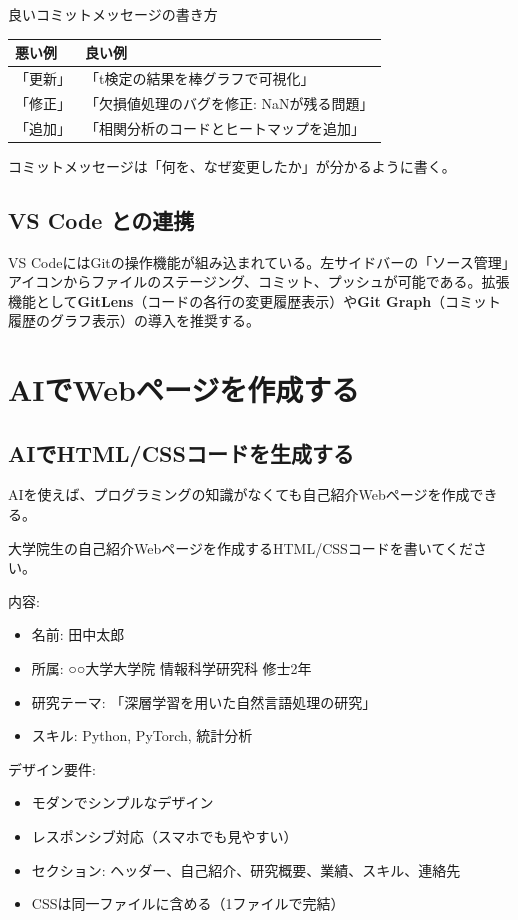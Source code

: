 \begin{itembox}[l]{良いコミットメッセージの書き方}
\begin{table}[H]
\centering
\begin{tabular}{ll}
\toprule
悪い例 & 良い例 \\
\midrule
「更新」 & 「t検定の結果を棒グラフで可視化」 \\
「修正」 & 「欠損値処理のバグを修正: NaNが残る問題」 \\
「追加」 & 「相関分析のコードとヒートマップを追加」 \\
\bottomrule
\end{tabular}
\end{table}
コミットメッセージは「何を、なぜ変更したか」が分かるように書く。
\end{itembox}

\subsection{VS Code との連携}

VS CodeにはGitの操作機能が組み込まれている。左サイドバーの「ソース管理」アイコンからファイルのステージング、コミット、プッシュが可能である。拡張機能として\textbf{GitLens}（コードの各行の変更履歴表示）や\textbf{Git Graph}（コミット履歴のグラフ表示）の導入を推奨する。

\section{AIでWebページを作成する}

\subsection{AIでHTML/CSSコードを生成する}

AIを使えば、プログラミングの知識がなくても自己紹介Webページを作成できる。

\begin{promptbox}
大学院生の自己紹介Webページを作成するHTML/CSSコードを書いてください。

内容:
\begin{itemize}
\item 名前: 田中太郎
\item 所属: ○○大学大学院 情報科学研究科 修士2年
\item 研究テーマ: 「深層学習を用いた自然言語処理の研究」
\item スキル: Python, PyTorch, 統計分析
\end{itemize}

デザイン要件:
\begin{itemize}
\item モダンでシンプルなデザイン
\item レスポンシブ対応（スマホでも見やすい）
\item セクション: ヘッダー、自己紹介、研究概要、業績、スキル、連絡先
\item CSSは同一ファイルに含める（1ファイルで完結）
\end{itemize}
\end{promptbox}

